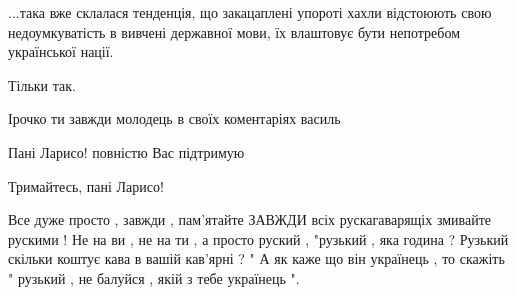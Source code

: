 \begin{itemize}
 

...така вже склалася тенденція, що закацаплені упороті хахли відстоюють свою
недоумкуватість в вивчені державної мови, їх влаштовує бути непотребом
української нації.


 
Тільки так.

 
Ірочко ти завжди молодець в своїх коментаріях василь

 
Пані Ларисо! повністю Вас підтримую

 
Тримайтесь, пані Ларисо!

 

Все дуже просто , завжди , пам'ятайте ЗАВЖДИ всіх рускагаварящіх змивайте
рускими ! Не на ви , не на ти , а просто руский , "рузький , яка година ?
Рузький скільки коштує кава в вашій кав'ярні ? " А як каже що він українець ,
то скажіть " рузький , не балуйся , якій з тебе українець ".


\end{itemize}
